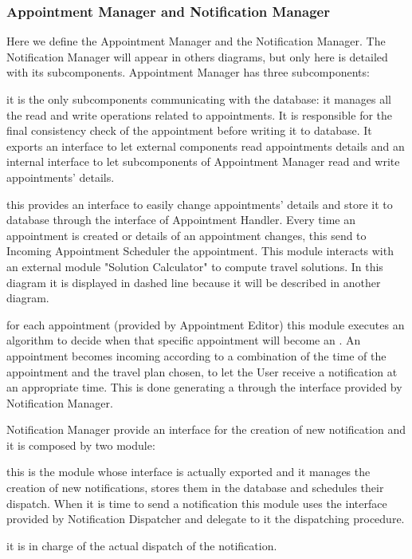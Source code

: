 	\subsubsection{Appointment Manager and Notification Manager}
		\label{sect:AppointmentManager}
		\label{sect:NotificationManager}
		Here we define the Appointment Manager and the Notification Manager. The Notification Manager will appear in others diagrams, but only here is detailed with its subcomponents. 
		\medskip\newline
		Appointment Manager has three subcomponents:		
		\begin{description}[before={\renewcommand{\makelabel}[1]{-- \textit{##1}:}}]
			\item[Appointment Handler] it is the only subcomponents communicating with the database: it manages all the read and write operations related to appointments. It is responsible for the final consistency check of the appointment before writing it to database. It exports an interface to let external components read appointments details and an internal interface to let subcomponents of Appointment Manager read and write appointments' details.
			\item[Appointment Editor] this provides an interface to easily change appointments' details and store it to database through the interface of Appointment Handler. Every time an appointment is created or details of an appointment changes, this send to Incoming Appointment Scheduler the appointment. This module interacts with an external module "Solution Calculator" to compute travel solutions. In this diagram it is displayed in dashed line because it will be described in another diagram.
			\item[Incoming Appointment Scheduler] for each appointment (provided by Appointment Editor) this module executes an algorithm to decide when that specific appointment will become an . An appointment becomes incoming according to a combination of the time of the appointment and the travel plan chosen, to let the User receive a notification at an appropriate time. This is done generating a  through the interface provided by Notification Manager.
		\end{description}
		\bigskip
		Notification Manager provide an interface for the creation of new notification and it is composed by two module:
		\begin{description}[before={\renewcommand{\makelabel}[1]{-- \textit{##1}:}}]
			\item[Notification Scheduler] this is the module whose interface is actually exported and it manages the creation of new notifications, stores them in the database and schedules their dispatch. When it is time to send a notification this module uses the interface provided by Notification Dispatcher and delegate to it the dispatching procedure.
			\item[Notification Dispatcher] it is in charge of the actual dispatch of the notification.
		\end{description}
		
